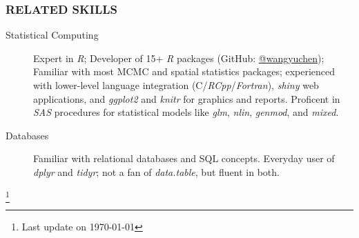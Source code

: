 \documentclass[11pt]{article}
\newcommand{\CPP}
{C\nolinebreak[4]\hspace{0em}\raisebox{.12ex}{\footnotesize\bf ++}}
\begin{document}
	\subsubsection*{\centering RELATED SKILLS}
	\vspace{-.3em}

	\begin{description}
		\item[Statistical Computing] Expert in \emph{R}; Developer of 15+ \emph{R}
		packages (GitHub: \href{https://www.github.com/wangyuchen}{@wangyuchen});
		Familiar with most MCMC and spatial statistics packages; experienced with lower-level language integration (\CPP{}/\emph{RCpp}/\emph{Fortran}),   \emph{shiny} web applications, and \emph{ggplot2} and \emph{knitr} for graphics and reports. Proficent in \emph{SAS} procedures for statistical models like \emph{glm}, \emph{nlin}, \emph{genmod}, and \emph{mixed}.
		\item[Databases] Familiar with relational databases and SQL concepts. Everyday user of \emph{dplyr} and \emph{tidyr}; not a fan of \emph{data.table}, but fluent in both.
	\end{description}


\let\thefootnote\relax\footnote{Last update on \today}
\end{document}
